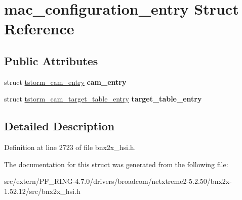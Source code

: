 \hypertarget{structmac__configuration__entry}{
\section{mac\_\-configuration\_\-entry Struct Reference}
\label{structmac__configuration__entry}
}
\subsection*{Public Attributes}
\begin{DoxyCompactItemize}
\item 
\hypertarget{structmac__configuration__entry_a9b28115c17a37efea6de2878c7f8bf09}{
struct \hyperlink{structtstorm__cam__entry}{tstorm\_\-cam\_\-entry} {\bfseries cam\_\-entry}}
\label{structmac__configuration__entry_a9b28115c17a37efea6de2878c7f8bf09}

\item 
\hypertarget{structmac__configuration__entry_ae41abf618de8921d6a6484a50cd46db6}{
struct \hyperlink{structtstorm__cam__target__table__entry}{tstorm\_\-cam\_\-target\_\-table\_\-entry} {\bfseries target\_\-table\_\-entry}}
\label{structmac__configuration__entry_ae41abf618de8921d6a6484a50cd46db6}

\end{DoxyCompactItemize}


\subsection{Detailed Description}


Definition at line 2723 of file bnx2x\_\-hsi.h.



The documentation for this struct was generated from the following file:\begin{DoxyCompactItemize}
\item 
src/extern/PF\_\-RING-\/4.7.0/drivers/broadcom/netxtreme2-\/5.2.50/bnx2x-\/1.52.12/src/bnx2x\_\-hsi.h\end{DoxyCompactItemize}
